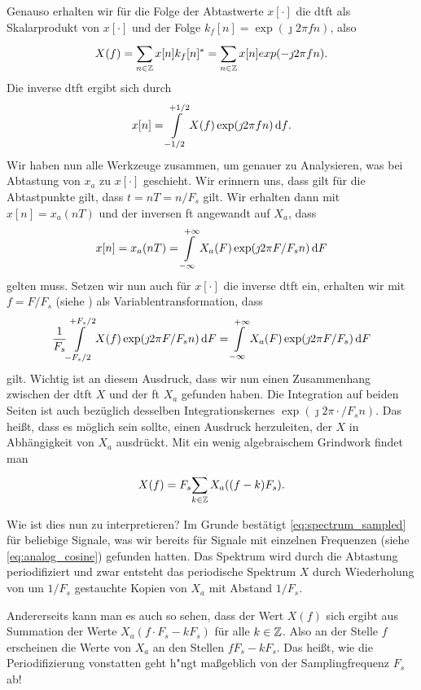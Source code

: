 Genauso erhalten wir für die Folge der Abtastwerte $x[\cdot]$ die \gls{dtft} als Skalarprodukt von $x[\cdot]$ und der Folge $k_f[n] = \exp(\jmath 2 \pi f n)$, also
%
\begin{equation}\label{eq:dtft_inner_prod}
    X(f) = {\sum\limits_{n \in \mathbb{Z}}^{}{
            x[n] k_f[n]^\ast
        }}
        = {\sum\limits_{n \in \mathbb{Z}}^{}{
            x[n] exp(-\jmath 2 \pi f n)
        }}.
\end{equation}
%
Die inverse \gls{dtft} ergibt sich durch
\[
x[n] = {\int\limits_{-1/2}^{+1/2}{X(f) \exp(\jmath 2 \pi f n)}\,\mathrm{d}{f}}.
\]
Wir haben nun alle Werkzeuge zusammen, um genauer zu Analysieren, was bei Abtastung von $x_a$ zu $x[\cdot]$ geschieht.
Wir erinnern uns, dass gilt für die Abtastpunkte gilt, dass $t = nT = n/F_s$ gilt.
Wir erhalten dann mit $x[n] = x_a(nT)$ und der inversen \gls{ft} angewandt auf $X_a$, dass
\[
x[n] = x_a(nT) = {\int\limits_{-\infty}^{+\infty}{X_a(F) \exp(\jmath 2 \pi F/F_s n)}\,\mathrm{d}{F}}
\]
gelten muss.
Setzen wir nun auch für $x[\cdot]$ die inverse \gls{dtft} ein, erhalten wir mit $f = F/F_s$ (siehe ) als Variablentransformation, dass
\[
    \frac{1}{F_s} {\int\limits_{-{F_s}/2}^{+{F_s}/2}{X(f) \exp(\jmath 2 \pi F/F_s n)}\,\mathrm{d}{F}}
    = {\int\limits_{-\infty}^{+\infty}{X_a(F) \exp(\jmath 2 \pi F/F_s)}\,\mathrm{d}{F}}
\]
gilt. 
Wichtig ist an diesem Ausdruck, dass wir nun einen Zusammenhang zwischen der \gls{dtft} $X$ und der \gls{ft} $X_a$ gefunden haben.
Die Integration auf beiden Seiten ist auch bezüglich desselben Integrationskernes $\exp(\jmath 2 \pi \cdot/F_s n)$.
Das heißt, dass es möglich sein sollte, einen Ausdruck herzuleiten, der $X$ in Abhängigkeit von $X_a$ ausdrückt.
Mit ein wenig algebraischem Grindwork findet man
\begin{equation}\label{eq:spectrum_sampled}
    X(f) = F_s {\sum\limits_{k \in \mathbb{Z}}^{}{
        X_a((f - k) F_s)
    }}.
\end{equation}

Wie ist dies nun zu interpretieren? 
Im Grunde bestätigt \eqref{eq:spectrum_sampled} für beliebige Signale, was wir bereits für Signale mit einzelnen Frequenzen (siehe \eqref{eq:analog_cosine}) gefunden hatten.
Das Spektrum wird durch die Abtastung periodifiziert und zwar entsteht das periodische Spektrum $X$ durch Wiederholung von um $1/F_s$ gestauchte Kopien von $X_a$ mit Abstand $1/F_s$.

Andererseits kann man es auch so sehen, dass der Wert $X(f)$ sich ergibt aus Summation der Werte $X_a(f \cdot F_s - k F_s)$ für alle $k \in \mathbb{Z}$. 
Also an der Stelle $f$ erscheinen die Werte von $X_a$ an den Stellen $f F_s - k F_s$.
Das heißt, wie die Periodifizierung vonstatten geht h"ngt maßgeblich von der Samplingfrequenz $F_s$ ab!

